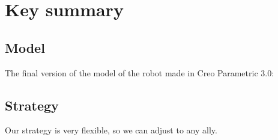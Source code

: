\section{Key summary}

\subsection{Model}
The final version of the model of the robot made in Creo Parametric 3.0:
\begin{figure}[H]
	\begin{minipage}[h]{1\linewidth}
	\end{minipage}
\end{figure}
\begin{figure}[H]
	\begin{minipage}[h]{1\linewidth}
	\end{minipage}
\end{figure}
\newpage
\subsection{Strategy}
Our strategy is very flexible, so we can adjust to any ally.

\newpage


